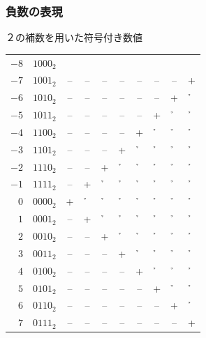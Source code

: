 \documentclass[handout]{beamer}        %
\begin{document}
\begin{frame}
  \frametitle{負数の表現}
  \begin{itembox}[l]{２の補数を用いた符号付き数値}
    \small\begin{tabular}{ r l c c c c c c c c }
    $-8$  & $1000_2$ &  &  &  &  &  &  &  &  \\
    $-7$  & $1001_2$ &--&--&--&--&--&--&--&+ \\
    $-6$  & $1010_2$ &--&--&--&--&--&--&+ &\h\\
    $-5$  & $1011_2$ &--&--&--&--&--&+ &\h&\h\\
    $-4$  & $1100_2$ &--&--&--&--&+ &\h&\h&\h\\
    $-3$  & $1101_2$ &--&--&--&+ &\h&\h&\h&\h\\
    $-2$  & $1110_2$ &--&--&+ &\h&\h&\h&\h&\h\\
    $-1$  & $1111_2$ &--&+ &\h&\h&\h&\h&\h&\h\\
    $ 0$  & $0000_2$ &+ &\h&\h&\h&\h&\h&\h&\h\\
    $ 1$  & $0001_2$ &--&+ &\h&\h&\h&\h&\h&\h\\
    $ 2$  & $0010_2$ &--&--&+ &\h&\h&\h&\h&\h\\
    $ 3$  & $0011_2$ &--&--&--&+ &\h&\h&\h&\h\\
    $ 4$  & $0100_2$ &--&--&--&--&+ &\h&\h&\h\\
    $ 5$  & $0101_2$ &--&--&--&--&--&+ &\h&\h\\
    $ 6$  & $0110_2$ &--&--&--&--&--&--&+ &\h\\
    $ 7$  & $0111_2$ &--&--&--&--&--&--&--&+ \\
    \end{tabular}
  \end{itembox}
\end{frame}
\end{document}
